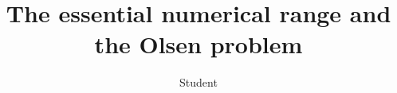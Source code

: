 \documentclass[xcolor=dvipsnames]{beamer}
\title[The essential numerical range and the Olsen problem]{The 
essential numerical range and the Olsen problem}
\author[{Student} (University of ....)]{Student}
\begin{document}
\begin{frame}

\end{frame}
\end{document}
